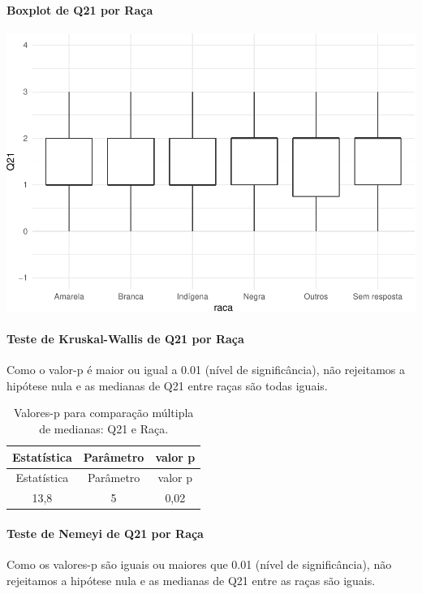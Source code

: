 \documentclass[]{article}
\let\oldparagraph\paragraph
\renewcommand{\paragraph}[1]{\oldparagraph{#1}\mbox{}}
\begin{document}
\hypertarget{boxplot-de-q21-por-rauxe7a}{%
\paragraph{Boxplot de Q21 por Raça}\label{boxplot-de-q21-por-rauxe7a}}

\begin{center}\includegraphics[width=0.75\linewidth]{relatorio_covid19_files/figure-latex/unnamed-chunk-461-1} \end{center}

\hypertarget{teste-de-kruskal-wallis-de-q21-por-rauxe7a}{%
\paragraph{Teste de Kruskal-Wallis de Q21 por Raça}\label{teste-de-kruskal-wallis-de-q21-por-rauxe7a}}

Como o valor-p é maior ou igual a 0.01 (nível de significância), não rejeitamos a hipótese nula e as medianas de Q21 entre raças são todas iguais.

\begin{longtable}[]{@{}ccc@{}}
\caption{\label{tab:unnamed-chunk-463}Valores-p para comparação múltipla de medianas: Q21 e Raça.}\tabularnewline
\toprule
Estatística & Parâmetro & valor p\tabularnewline
\midrule
\endfirsthead
\toprule
Estatística & Parâmetro & valor p\tabularnewline
\midrule
\endhead
13,8 & 5 & 0,02\tabularnewline
\bottomrule
\end{longtable}

\hypertarget{teste-de-nemeyi-de-q21-por-rauxe7a}{%
\paragraph{Teste de Nemeyi de Q21 por Raça}\label{teste-de-nemeyi-de-q21-por-rauxe7a}}

Como os valores-p são iguais ou maiores que 0.01 (nível de significância), não rejeitamos a hipótese nula e as medianas de Q21 entre as raças são iguais.
\end{document}
